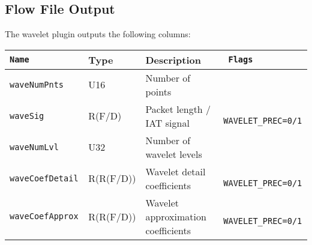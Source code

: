 \documentclass[documentation]{subfiles}
\begin{document}
\subsection{Flow File Output}
The wavelet plugin outputs the following columns:
\begin{longtable}{>{\tt}lll>{\tt\small}l}
    \toprule
    {\bf Name} & {\bf Type} & {\bf Description} & {\bf Flags}\\
    \midrule\endhead%
    waveNumPnts    & U16       & Number of points                   & \\
    waveSig        & R(F/D)    & Packet length / IAT signal         & WAVELET\_PREC=0/1\\
    waveNumLvl     & U32       & Number of wavelet levels           & \\
    waveCoefDetail & R(R(F/D)) & Wavelet detail coefficients        & WAVELET\_PREC=0/1\\
    waveCoefApprox & R(R(F/D)) & Wavelet approximation coefficients & WAVELET\_PREC=0/1\\
    \bottomrule
\end{longtable}
\end{document}
